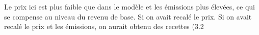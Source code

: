 Le prix ici est plus faible que dans le modèle et les émissions plus élevées, ce qui se compense au niveau du revenu de base. Si on avait recalé le prix. Si on avait recalé le prix et les émissions, on aurait obtenu des recettes (3.2%